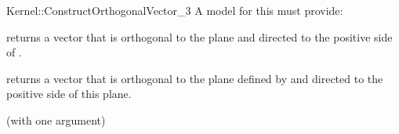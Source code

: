 \begin{ccRefFunctionObjectConcept}{Kernel::ConstructOrthogonalVector_3}
A model for this must provide:


{returns a vector that is orthogonal to the plane  and directed
 to the positive side of .}

{returns a vector that is orthogonal to the plane defined by 
  and directed
 to the positive side of this plane.}

\ccRefines
{} (with one argument)

\ccSeeAlso
{} \\
\\

\end{ccRefFunctionObjectConcept}
